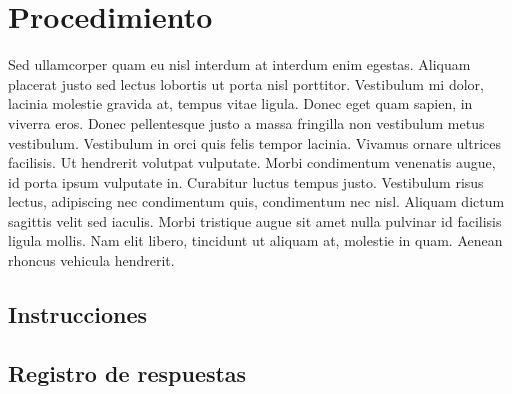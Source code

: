 
\section{Procedimiento}

Sed ullamcorper quam eu nisl interdum at interdum enim egestas. Aliquam placerat justo sed lectus lobortis ut porta nisl porttitor. Vestibulum mi dolor, lacinia molestie gravida at, tempus vitae ligula. Donec eget quam sapien, in viverra eros. Donec pellentesque justo a massa fringilla non vestibulum metus vestibulum. Vestibulum in orci quis felis tempor lacinia. Vivamus ornare ultrices facilisis. Ut hendrerit volutpat vulputate. Morbi condimentum venenatis augue, id porta ipsum vulputate in. Curabitur luctus tempus justo. Vestibulum risus lectus, adipiscing nec condimentum quis, condimentum nec nisl. Aliquam dictum sagittis velit sed iaculis. Morbi tristique augue sit amet nulla pulvinar id facilisis ligula mollis. Nam elit libero, tincidunt ut aliquam at, molestie in quam. Aenean rhoncus vehicula hendrerit.

\subsection{Instrucciones}



\subsection{Registro de respuestas}